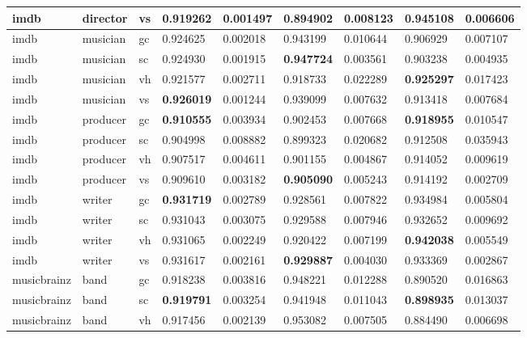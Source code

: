 \documentclass[epsfig,a4paper,11pt,titlepage,twoside,openany]{book}
\begin{document}
\begin{longtable}{|l|l|l|l|l|l|l|l|l|}
imdb & director & vs    & \textbf{0.919262} & 0.001497 & 0.894902          & 0.008123 & 0.945108          & 0.006606 \\ \hline
imdb & musician & gc    & 0.924625          & 0.002018 & 0.943199          & 0.010644 & 0.906929          & 0.007107 \\
imdb & musician & sc    & 0.924930          & 0.001915 & \textbf{0.947724} & 0.003561 & 0.903238          & 0.004935 \\
imdb & musician & vh    & 0.921577          & 0.002711 & 0.918733          & 0.022289 & \textbf{0.925297} & 0.017423 \\
imdb & musician & vs    & \textbf{0.926019} & 0.001244 & 0.939099          & 0.007632 & 0.913418          & 0.007684 \\ \hline 
imdb & producer & gc    & \textbf{0.910555} & 0.003934 & 0.902453          & 0.007668 & \textbf{0.918955} & 0.010547 \\
imdb & producer & sc    & 0.904998          & 0.008882 & 0.899323          & 0.020682 & 0.912508          & 0.035943 \\
imdb & producer & vh    & 0.907517          & 0.004611 & 0.901155          & 0.004867 & 0.914052          & 0.009619 \\
imdb & producer & vs    & 0.909610          & 0.003182 & \textbf{0.905090} & 0.005243 & 0.914192          & 0.002709 \\ \hline
imdb & writer   & gc    & \textbf{0.931719} & 0.002789 & 0.928561          & 0.007822 & 0.934984          & 0.005804 \\
imdb & writer   & sc    & 0.931043          & 0.003075 & 0.929588          & 0.007946 & 0.932652          & 0.009692 \\
imdb & writer   & vh    & 0.931065          & 0.002249 & 0.920422          & 0.007199 & \textbf{0.942038} & 0.005549 \\
imdb & writer   & vs    & 0.931617          & 0.002161 & \textbf{0.929887} & 0.004030 & 0.933369          & 0.002867 \\ \hline
musicbrainz & band     & gc    & 0.918238          & 0.003816 & 0.948221          & 0.012288 & 0.890520          & 0.016863 \\
musicbrainz & band     & sc    & \textbf{0.919791} & 0.003254 & 0.941948          & 0.011043 & \textbf{0.898935} & 0.013037 \\
musicbrainz & band     & vh    & 0.917456          & 0.002139 & 0.953082          & 0.007505 & 0.884490          & 0.006698 \\

\end{longtable}
\end{document}
